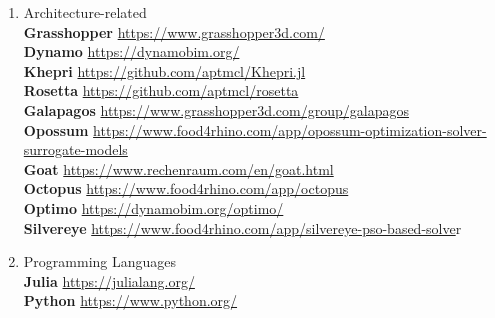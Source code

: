 \begin{enumerate}[label=\Alph*]
\item Architecture-related \\
\textbf{Grasshopper} \url{https://www.grasshopper3d.com/} \\ 
\textbf{Dynamo} \url{https://dynamobim.org/} \\
\textbf{Khepri} \url{https://github.com/aptmcl/Khepri.jl} \\
\textbf{Rosetta} \url{https://github.com/aptmcl/rosetta} \\
\textbf{Galapagos} \url{https://www.grasshopper3d.com/group/galapagos} \\ 
\textbf{Opossum}  \url{https://www.food4rhino.com/app/opossum-optimization-solver-surrogate-models} \\
\textbf{Goat} \url{https://www.rechenraum.com/en/goat.html} \\
\textbf{Octopus} \url{https://www.food4rhino.com/app/octopus} \\
\textbf{Optimo} \url{https://dynamobim.org/optimo/} \\
\textbf{Silvereye} \url{https://www.food4rhino.com/app/silvereye-pso-based-solve}r \\

\item Programming Languages \\
\textbf{Julia} \url{https://julialang.org/} \\
\textbf{Python} \url{https://www.python.org/}

\end{enumerate}